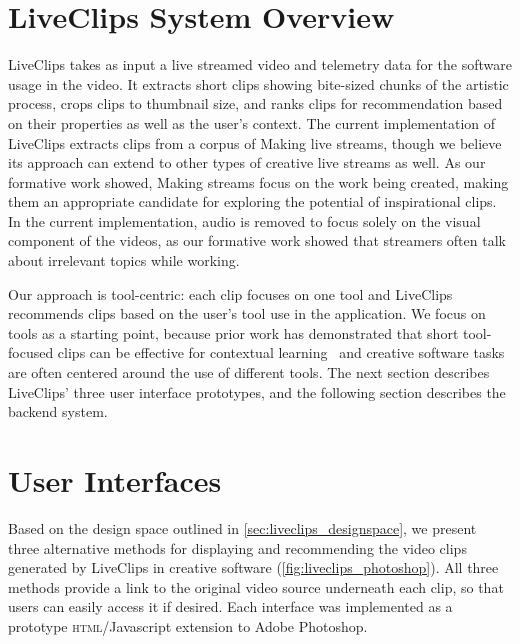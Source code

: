 \section{LiveClips System Overview}
\label{sec:liveclips_system}

LiveClips takes as input a live streamed video and telemetry data for the software usage in the video. It extracts short clips showing bite-sized chunks of the artistic process, crops clips to thumbnail size, and ranks clips for recommendation based on their properties as well as the user's context. The current implementation of LiveClips extracts clips from a corpus of Making live streams, though we believe its approach can extend to other types of creative live streams as well. As our formative work showed, Making streams focus on the work being created, making them an appropriate candidate for exploring the potential of inspirational clips. In the current implementation, audio is removed to focus solely on the visual component of the videos, as our formative work showed that streamers often talk about irrelevant topics while working.

Our approach is tool-centric: each clip focuses on one tool and LiveClips recommends clips based on the user's tool use in the application. We focus on tools as a starting point, because prior work has demonstrated that short tool-focused clips can be effective for contextual learning~\cite{Grossman2010a} and creative software tasks are often centered around the use of different tools. The next section describes LiveClips' three user interface prototypes, and the following section describes the backend system.

\section{User Interfaces}
Based on the design space outlined in \autoref{sec:liveclips_designspace}, we present three alternative methods for displaying and recommending the video clips generated by LiveClips in creative software (\autoref{fig:liveclips_photoshop}).
All three methods provide a link to the original video source underneath each clip, so that users can easily access it if desired. Each interface was implemented as a prototype \textsc{html}/Javascript extension to Adobe Photoshop.

